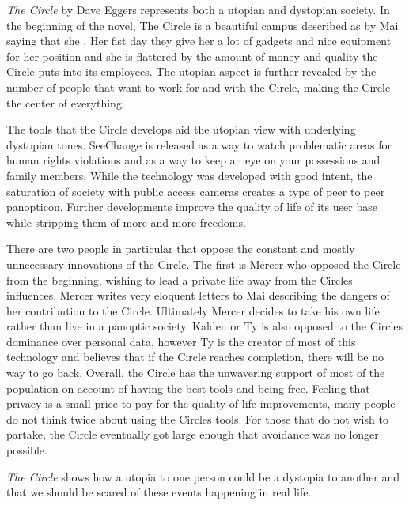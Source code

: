 \textit{The Circle} by Dave Eggers represents both a utopian and dystopian society.
In the beginning of the novel, The Circle is a beautiful campus described as  by Mai saying that she .
Her fist day they give her a lot of gadgets and nice equipment for her position and she is flattered by the amount of money and quality the Circle puts into its employees.
The utopian aspect is further revealed by the number of people that want to work for and with the Circle, making the Circle the center of everything.

The tools that the Circle develops aid the utopian view with underlying dystopian tones.
SeeChange is released as a way to watch problematic areas for human rights violations and as a way to keep an eye on your possessions and family members.
While the technology was developed with good intent, the saturation of society with public access cameras creates a type of peer to peer panopticon.
Further developments improve the quality of life of its user base while stripping them of more and more freedoms.

There are two people in particular that oppose the constant and mostly unnecessary innovations of the Circle.
The first is Mercer who opposed the Circle from the beginning, wishing to lead a private life away from the Circles influences.
Mercer writes very eloquent letters to Mai describing the dangers of her contribution to the Circle.
Ultimately Mercer decides to take his own life rather than live in a panoptic society.
Kalden or Ty is also opposed to the Circles dominance over personal data, however Ty is the creator of most of this technology and believes that if the Circle reaches completion, there will be no way to go back.
Overall, the Circle has the unwavering support of most of the population on account of having the best tools and being free.
Feeling that privacy is a small price to pay for the quality of life improvements, many people do not think twice about using the Circles tools.
For those that do not wish to partake, the Circle eventually got large enough that avoidance was no longer possible.

\textit{The Circle} shows how a utopia to one person could be a dystopia to another and that we should be scared of these events happening in real life.